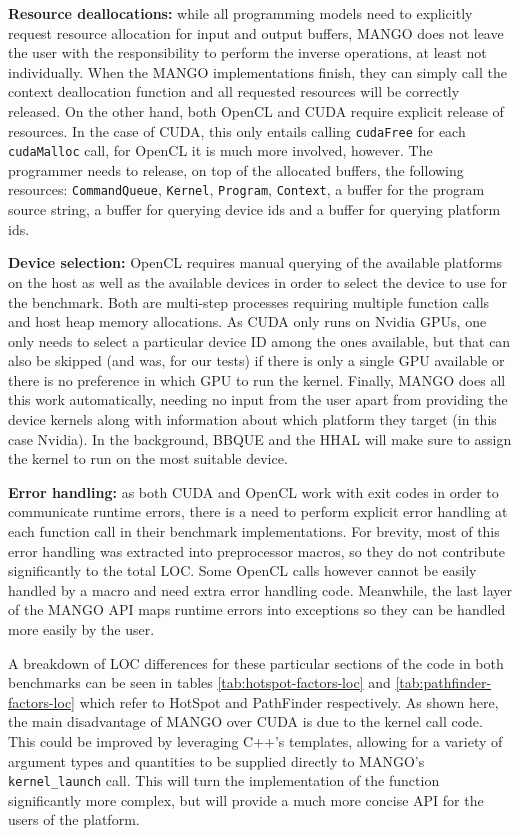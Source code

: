 \textbf{Resource deallocations:} while all programming models need to explicitly request resource allocation for input and output buffers, MANGO does not leave the user with the responsibility to perform the inverse operations, at least not individually. When the MANGO implementations finish, they can simply call the context deallocation function and all requested resources will be correctly released. On the other hand, both OpenCL and CUDA require explicit release of resources. In the case of CUDA, this only entails calling \texttt{cudaFree} for each \texttt{cudaMalloc} call, for OpenCL it is much more involved, however. The programmer needs to release, on top of the allocated buffers, the following resources: \texttt{CommandQueue}, \texttt{Kernel}, \texttt{Program}, \texttt{Context}, a buffer for the program source string, a buffer for querying device ids and a buffer for querying platform ids.

\textbf{Device selection:} OpenCL requires manual querying of the available platforms on the host as well as the available devices in order to select the device to use for the benchmark. Both are multi-step processes requiring multiple function calls and host heap memory allocations. As CUDA only runs on Nvidia GPUs, one only needs to select a particular device ID among the ones available, but that can also be skipped (and was, for our tests) if there is only a single GPU available or there is no preference in which GPU to run the kernel. Finally, MANGO does all this work automatically, needing no input from the user apart from providing the device kernels along with information about which platform they target (in this case Nvidia). In the background, BBQUE and the HHAL will make sure to assign the kernel to run on the most suitable device.

\textbf{Error handling:} as both CUDA and OpenCL work with exit codes in order to communicate runtime errors, there is a need to perform explicit error handling at each function call in their benchmark implementations. For brevity, most of this error handling was extracted into preprocessor macros, so they do not contribute significantly to the total LOC. Some OpenCL calls however cannot be easily handled by a macro and need extra error handling code. Meanwhile, the last layer of the MANGO API maps runtime errors into exceptions so they can be handled more easily by the user.

A breakdown of LOC differences for these particular sections of the code in both benchmarks can be seen in tables \ref{tab:hotspot-factors-loc} and \ref{tab:pathfinder-factors-loc} which refer to HotSpot and PathFinder respectively. As shown here, the main disadvantage of MANGO over CUDA is due to the kernel call code. This could be improved by leveraging C++'s templates, allowing for a variety of argument types and quantities to be supplied directly to MANGO's \texttt{kernel\_launch} call. This will turn the implementation of the function significantly more complex, but will provide a much more concise API for the users of the platform.


